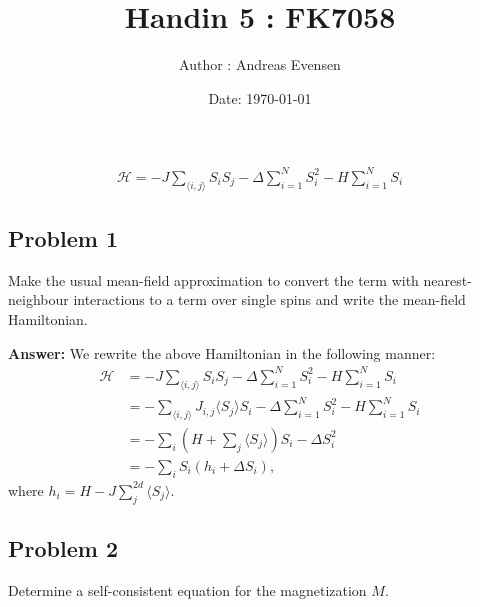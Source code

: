 \documentclass[a4paper]{article}
\title{Handin 5 :  FK7058}
\author{Author : Andreas Evensen}
\date{Date: \today}
\newcommand{\newparagraph}{\vspace{.5cm}\noindent}
\newcommand{\average}[1]{\langle #1 \rangle}
\begin{document}
\maketitle

\begin{align*}
    \mathcal{H} = -J \sum_{\average{i,j}}S_iS_j - \Delta \sum_{i=1}^NS_i^2 - H \sum_{i = 1}^NS_i
\end{align*}

\subsection*{Problem 1}
Make the usual mean-field approximation to convert the term with nearest-neighbour interactions to a term over single spins and write the mean-field Hamiltonian.

\newparagraph
\textbf{Answer:} We rewrite the above Hamiltonian in the following manner:
\begin{align*}
    \mathcal{H} &= -J \sum_{\average{i,j}}S_iS_j - \Delta \sum_{i=1}^NS_i^2 - H \sum_{i = 1}^NS_i\\
    &= -\sum_{\average{i,j}}J_{i,j}\average{S_j}S_i - \Delta \sum_{i=1}^NS_i^2 - H \sum_{i = 1}^NS_i\\
    &= -\sum_i (H + \sum_{j}\average{S_j})S_i - \Delta S_i^2\\
    &= -\sum_i S_i(h_i + \Delta S_i),
\end{align*}where $h_i = H - J\sum_j^{2d} \average{S_j}$.


\subsection*{Problem 2}
Determine a self-consistent equation for the magnetization $M$.
\end{document}
